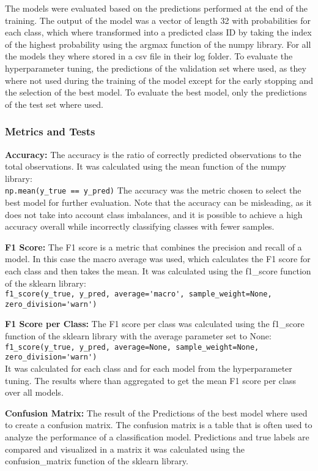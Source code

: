 The models were evaluated based on the predictions performed at the end of the training.
The output of the model was a vector of length 32 with probabilities for each class, which where
transformed into a predicted class ID by taking the index of the highest probability
using the argmax function of the numpy library. For all the models they where stored in a csv file
in their log folder. To evaluate the hyperparameter tuning, the predictions of the validation set
where used, as they where not used during the training of the model except for the early stopping
and the selection of the best model. To evaluate the best model, only the predictions of the test set
where used.

\subsubsection{Metrics and Tests}

\textbf{Accuracy:} The accuracy is the ratio of correctly predicted observations to the total observations.
It was calculated using the mean function of the numpy library:\\ 
\lstinline{np.mean(y_true == y_pred)}
The accuracy was the metric chosen to select the best model for further evaluation.
Note that the accuracy can be misleading, as it does not take into account class imbalances, 
and it is possible to achieve a high accuracy overall while incorrectly classifying classes with fewer samples.

\textbf{F1 Score:} The F1 score is a metric that combines the precision and recall of a model. In this
case the macro average was used, which calculates the F1 score for each class and then takes the mean.
It was calculated using the f1\_score function of the sklearn library:\\ 
\lstinline{f1_score(y_true, y_pred, average='macro', sample_weight=None, zero_division='warn')}

\textbf{F1 Score per Class:} The F1 score per class was calculated
using the f1\_score function of the sklearn library with the average parameter set to None:\\
\lstinline{f1_score(y_true, y_pred, average=None, sample_weight=None, zero_division='warn')}\\
It was calculated for each class and for each model from the hyperparameter tuning. The results
where than aggregated to get the mean F1 score per class over all models.

\textbf{Confusion Matrix:} The result of the Predictions of the best model where used to create a confusion matrix.
The confusion matrix is a table that is often used to analyze the performance of a classification model.
Predictions and true labels are compared and visualized in a matrix it was calculated using the 
confusion\_matrix function of the sklearn library.

